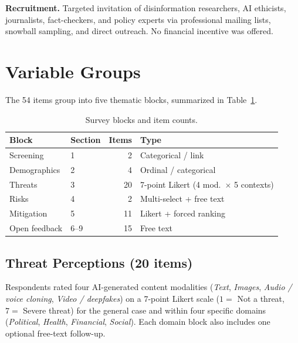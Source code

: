 \noindent\textbf{Recruitment.}
Targeted invitation of disinformation researchers, AI ethicists, journalists,
fact-checkers, and policy experts via professional mailing lists, snowball
sampling, and direct outreach. No financial incentive was offered.

\section{Variable Groups}
\label{sec:codebook-variables}

The 54 items group into five thematic blocks, summarized in
Table~\ref{tab:codebook-blocks}.

\begin{table}[htbp]
\centering
\caption{Survey blocks and item counts.}
\label{tab:codebook-blocks}
\begin{tabular}{llrl}
\toprule
\textbf{Block} & \textbf{Section} & \textbf{Items} & \textbf{Type} \\
\midrule
Screening      & 1                & 2  & Categorical / link  \\
Demographics   & 2                & 4  & Ordinal / categorical \\
Threats        & 3                & 20 & 7-point Likert (4 mod.\ $\times$ 5 contexts) \\
Risks          & 4                & 2  & Multi-select + free text \\
Mitigation     & 5                & 11 & Likert + forced ranking \\
Open feedback  & 6--9             & 15 & Free text \\
\bottomrule
\end{tabular}
\end{table}

\subsection{Threat Perceptions (20 items)}
Respondents rated four AI-generated content modalities
(\textit{Text}, \textit{Images}, \textit{Audio / voice cloning},
\textit{Video / deepfakes}) on a 7-point Likert scale
($1 = $ Not a threat, $7 = $ Severe threat) for the general case
and within four specific domains
(\textit{Political}, \textit{Health}, \textit{Financial}, \textit{Social}).
Each domain block also includes one optional free-text follow-up.

